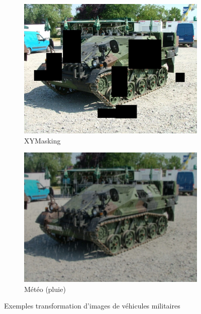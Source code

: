 \begin{figure}[H]
\begin{subfigure}[b]{0.45\textwidth}
        \centering
        \includegraphics[width=\textwidth]{./images/xymasking.jpg}
        \caption{XYMasking}
        \label{fig:xymasking}
    \end{subfigure}
    \hfill
    \begin{subfigure}[b]{0.45\textwidth}
        \centering
        \includegraphics[width=\textwidth]{./images/weather_effect.jpg}
        \caption{Météo (pluie)}
        \label{fig:meteo}
    \end{subfigure}
    \caption{Exemples transformation d'images de véhicules militaires}
    \label{fig:military-vehicles}
\end{figure}




